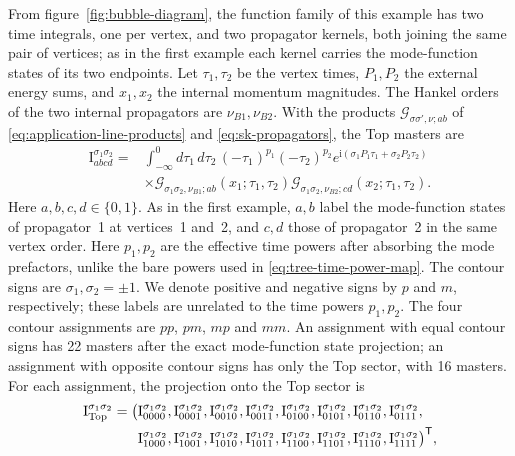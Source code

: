\documentclass[11pt,a4paper]{article}
\newcommand{\ii}{\mathrm i}
\begin{document}
From figure~\ref{fig:bubble-diagram}, the function family of this example has two time
integrals, one per vertex, and two propagator kernels, both joining the same pair of vertices; as
in the first example each kernel carries the mode-function states of its two endpoints.
Let $\tau_1,\tau_2$ be the vertex times, $P_1,P_2$ the external energy sums,
and $x_1,x_2$ the internal momentum magnitudes.
The Hankel orders of the two internal propagators are $\nu_{B1},\nu_{B2}$.
With the products $\mathcal G_{\sigma\sigma',\nu;ab}$ of
\eqref{eq:application-line-products} and \eqref{eq:sk-propagators}, the Top masters are
\begin{equation}
 \begin{aligned}
 \text{I}^{\sigma_1\sigma_2}_{abcd}
 ={}&\int_{-\infty}^{0}d\tau_1\,d\tau_2\,
 (-\tau_1)^{p_1}(-\tau_2)^{p_2}
 e^{\ii(\sigma_1P_1\tau_1+\sigma_2P_2\tau_2)}\\
 &\times\mathcal G_{\sigma_1\sigma_2,\nu_{B1};ab}(x_1;\tau_1,\tau_2)
 \mathcal G_{\sigma_1\sigma_2,\nu_{B2};cd}(x_2;\tau_1,\tau_2).
 \end{aligned}
 \label{eq:bubble-indexed-masters}
\end{equation}
Here $a,b,c,d\in\{0,1\}$. As in the first example, $a,b$ label the mode-function states of
propagator~1 at vertices~1 and~2, and $c,d$ those of propagator~2 in the same vertex order.
Here $p_1,p_2$ are the effective time powers after absorbing the mode
prefactors, unlike the bare powers used in \eqref{eq:tree-time-power-map}.
The contour signs are $\sigma_1,\sigma_2=\pm1$.
We denote positive and negative signs by $p$ and $m$, respectively;
these labels are unrelated to the time powers $p_1,p_2$.
The four contour assignments are $pp$, $pm$, $mp$ and $mm$.
An assignment with equal contour signs has 22 masters after the
exact mode-function state projection; an assignment with opposite contour signs has only the
Top sector, with 16 masters.
For each assignment, the projection onto the Top sector is
\begin{equation}
 \begin{aligned}
 \bm{\text I}^{\sigma_1\sigma_2}_{\rm Top}
 =\bigl(&\text{I}^{\sigma_1\sigma_2}_{0000},
        \text{I}^{\sigma_1\sigma_2}_{0001},
        \text{I}^{\sigma_1\sigma_2}_{0010},
        \text{I}^{\sigma_1\sigma_2}_{0011},
        \text{I}^{\sigma_1\sigma_2}_{0100},
        \text{I}^{\sigma_1\sigma_2}_{0101},
        \text{I}^{\sigma_1\sigma_2}_{0110},
        \text{I}^{\sigma_1\sigma_2}_{0111},\\
       &\text{I}^{\sigma_1\sigma_2}_{1000},
        \text{I}^{\sigma_1\sigma_2}_{1001},
        \text{I}^{\sigma_1\sigma_2}_{1010},
        \text{I}^{\sigma_1\sigma_2}_{1011},
        \text{I}^{\sigma_1\sigma_2}_{1100},
        \text{I}^{\sigma_1\sigma_2}_{1101},
        \text{I}^{\sigma_1\sigma_2}_{1110},
        \text{I}^{\sigma_1\sigma_2}_{1111}\bigr)^{\mathsf T},
 \end{aligned}
 \label{eq:bubble-top-vector}
\end{equation}
\end{document}
